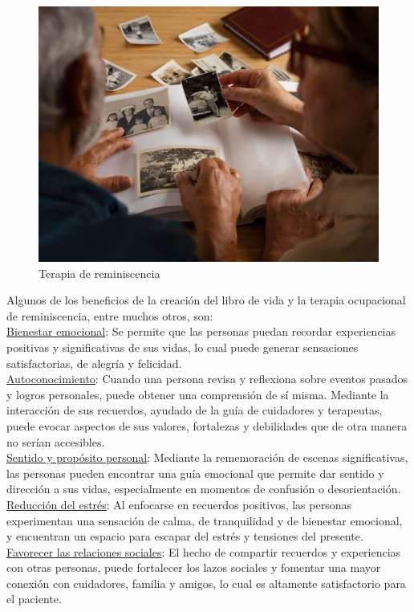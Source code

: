 \begin{figure}[h]
	\centering
	\includegraphics[width = 0.7 \textwidth]{Imagenes/Vectorial/terapiareminis.jpg}
	\caption{Terapia de reminiscencia}
	\label{fig:terapia}
\end{figure}

Algunos de los beneficios de la creación del libro de vida y la terapia ocupacional de reminiscencia, entre muchos otros, son:\\

\underline{Bienestar emocional}: Se permite que las personas puedan recordar experiencias positivas y significativas de sus vidas, lo cual puede generar sensaciones satisfactorias, de alegría y felicidad.\\

\underline{Autoconocimiento}: Cuando una persona revisa y reflexiona sobre eventos pasados y logros personales, puede obtener una comprensión de sí misma. Mediante la interacción de sus recuerdos, ayudado de la guía de cuidadores y terapeutas, puede evocar aspectos de sus valores, fortalezas y debilidades que de otra manera no serían accesibles.\\

\underline{Sentido y propósito personal}: Mediante la rememoración de escenas significativas, las personas pueden encontrar una guía emocional que permite dar sentido y dirección a sus vidas, especialmente en momentos de confusión o desorientación.\\

\underline{Reducción del estrés}: Al enfocarse en recuerdos positivos, las personas experimentan una sensación de calma, de tranquilidad y de bienestar emocional, y encuentran un espacio para escapar del estrés y tensiones del presente.\\

\underline{Favorecer las relaciones sociales}: El hecho de compartir recuerdos y experiencias con otras personas, puede fortalecer los lazos sociales y fomentar una mayor conexión con cuidadores, familia y amigos, lo cual es altamente satisfactorio para el paciente.\\

